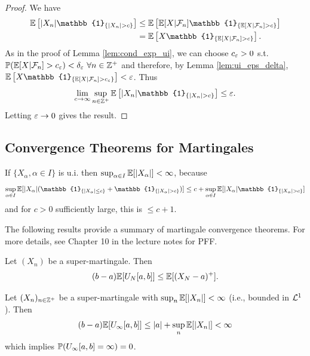 \begin{proof}
    We have
    \begin{align*}
        \EE \left[ |X_n| \mathbb{1}_{\{|X_n| > c\}} \right] &\leq \EE \left[ \EE[X | \mc{F}_n] \mathbb{1}_{\{\EE[X | \mc{F}_n] > c\}} \right] \\
        &= \EE \left[ X \mathbb{1}_{\{\EE[X | \mc{F}_n] > c\}} \right].
    \end{align*}
    As in the proof of Lemma \ref{lem:cond_exp_ui}, we can choose $c_\varepsilon > 0$ s.t. $\mathbb P(\mathbb E[X | \mathcal{F}_n] > c_\varepsilon) < \delta_\varepsilon \ \forall n \in \mathbb Z^+$ and therefore, by Lemma \ref{lem:ui_eps_delta}, $\EE \left[ X \mathbb{1}_{\{\EE[X | \mc{F}_n] > c_\eps\}} \right] < \eps$. Thus
    \[ \lim_{c \to \infty} \sup_{n \in \ZZ^+} \EE \left[ |X_n| \mathbb{1}_{\{|X_n| > c\}} \right] \leq \eps. \]
    Letting $\varepsilon \to 0$ gives the result.
\end{proof}

\subsection{Convergence Theorems for Martingales}

\begin{remark}
    If $\{X_\alpha, \alpha \in I\}$ is u.i. then $\sup_{\alpha \in I} \mathbb E[|X_\alpha|] < \infty$, because
    \[ \sup_{\alpha \in I} \EE[|X_\alpha| (\mathbb{1}_{\{|X_\alpha| \leq c\}} + \mathbb{1}_{\{|X_\alpha| > c\}})] \leq c + \sup_{\alpha \in I} \EE[|X_\alpha| \mathbb{1}_{\{|X_\alpha| > c\}}] \]
    and for $c > 0$ sufficiently large, this is $\leq c + 1$.
\end{remark}

\begin{remark}
    The following results provide a summary of martingale convergence theorems. For more details, see Chapter 10 in the lecture notes for PFF.
\end{remark}

\begin{lemma}
    Let $(X_n)$ be a super-martingale. Then
    \[ (b-a) \mathbb E[U_N[a,b]] \leq \mathbb E[(X_N - a)^+]. \]
\end{lemma}

\begin{corollary}
    Let $(X_n)_{n \in \mathbb Z^+}$ be a super-martingale with $\sup_n \mathbb E[|X_n|] < \infty$ (i.e., bounded in $\mathcal{L}^1$). Then
    \[ (b-a) \mathbb E[U_\infty[a,b]] \leq |a| + \sup_n \mathbb E[|X_n|] < \infty \]
    which implies $\mathbb P(U_\infty[a,b] = \infty) = 0$.
\end{corollary}

